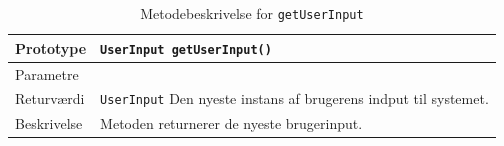 \begin{table}[h]
\begin{tabularx}{\textwidth}{| L{2.5 cm} | Z |} \hline
Prototype & \texttt{UserInput getUserInput()} \\\hline
Parametre &  ~\newline \\\hline
Returværdi &  \texttt{UserInput} \newline Den nyeste instans af brugerens indput til systemet. \\\hline
Beskrivelse & Metoden returnerer de nyeste brugerinput. \\\hline
\end{tabularx}
\caption{Metodebeskrivelse for \texttt{getUserInput}}
\label{table:met_getUserInput}
\end{table}
